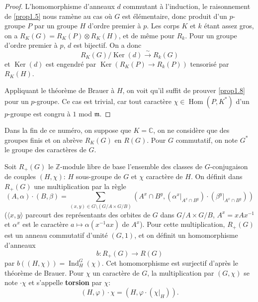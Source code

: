 \documentclass[11pt,a4paper]{amsart}
\theoremstyle{plain}
\theoremstyle{definition}
\DeclareMathOperator{\Ind}{Ind}
\DeclareMathOperator{\Hom}{Hom}
\DeclareMathOperator{\Ker}{Ker}
\newcommand{\dbZ}{\mathbb{Z}}
\newcommand{\dbC}{\mathbb{C}}
\newenvironment{para}{\par\noindent}{\par}
\newcommand{\isom}{\xrightarrow{\sim}}
\begin{document}
\begin{proof}
L'homomorphisme d'anneaux $d$ commutant \`a l'induction, le raisonnement de \ref{prop1.5} nous ram\`ene au cas o\`u $G$ est \'el\'ementaire, donc produit d'un $p$-groupe $P$ par un groupe $H$ d'ordre premier \`a $p$. Les corps $K$ et $k$ \'etant assez gros, on a $R_{K}(G) = R_{K}(P) \otimes R_{K}(H)$, et de m\^eme pour $R_{k}$. Pour un groupe d'ordre premier \`a $p$, $d$ est bijectif. On a donc
\[
R_{K}(G)/\Ker(d) \isom R_{k}(G)
\]
et $\Ker(d)$ est engendr\'e par $\Ker(R_{K}(P) \to R_{k}(P))$ tensoris\'e par $R_{K}(H)$.

Appliquant le th\'eor\`eme de Brauer \`a $H$, on voit qu'il suffit de prouver \ref{prop1.8} pour un $p$-groupe. Ce cas est trivial, car tout caract\`ere $\chi \in \Hom(P,K^{*})$ d'un $p$-groupe est congru \`a $1$ mod $\mathfrak{m}$.
\end{proof}

\begin{para}
Dans la fin de ce num\'ero, on suppose que $K = \dbC$, on ne consid\`ere que des groupes finis et on abr\`eve $R_{K}(G)$ en $R(G)$. Pour $G$ commutatif, on note $G^{*}$ le groupe des caract\`eres de $G$.
\end{para}

\begin{para}
Soit $R_{+}(G)$ le $\dbZ$-module libre de base l'ensemble des classes de $G$-conjugaison de couples $(H,\chi)$: $H$ sous-groupe de $G$ et $\chi$ caract\`ere de $H$. On d\'efinit dans $R_{+}(G)$ une multiplication par la r\`egle
\begin{equation}\label{eq1.9.1}
(A,\alpha) \cdot (B,\beta) = \sum_{(x,y) \in G \setminus (G/A \times G/B)} (A^{x} \cap B^{y}, (\alpha^{x}|_{A^{x} \cap B^{y}}) \cdot (\beta^{y}|_{A^{x} \cap B^{y}}))
\end{equation}
($\langle x,y \rangle$ parcourt des repr\'esentants des orbites de $G$ dans $G/A \times G/B$, $A^{x} = xAx^{-1}$ et $\alpha^{x}$ est le caract\`ere $a \mapsto \alpha(x^{-1}ax)$ de $A^{x}$). Pour cette multiplication, $R_{+}(G)$ est un anneau commutatif d'unit\'e $(G,1)$, et on d\'efinit un homomorphisme d'anneaux
\begin{equation}\label{eq1.9.2}
b: R_{+}(G) \longrightarrow R(G)
\end{equation}
par $b((H,\chi)) = \Ind_{H}^{G}(\chi)$. Cet homomorphisme est surjectif d'apr\`es le th\'eor\`eme de Brauer. Pour $\chi$ un caract\`ere de $G$, la multiplication par $(G,\chi)$ se note $\cdot \chi$ et s'appelle \textbf{torsion} par $\chi$:
\begin{equation}\label{eq1.9.3}
(H,\varphi) \cdot \chi = (H, \varphi \cdot (\chi|_{H})).
\end{equation}
\end{para}
\end{document}
